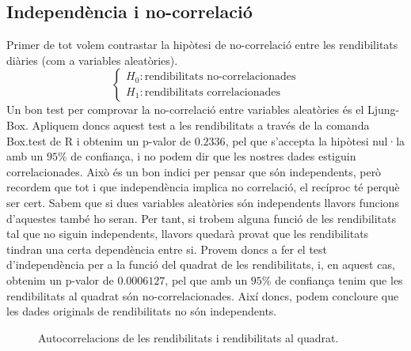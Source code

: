 \documentclass{article}
\numberwithin{table}{section}
\numberwithin{figure}{section}
\numberwithin{equation}{section}
\begin{document}
\subsection{Independència i no-correlació}%
Primer de tot volem contrastar la hipòtesi de no-correlació entre les rendibilitats diàries (com a variables aleatòries).
\begin{equation}
  \begin{cases}
    H_0: \text{rendibilitats no-correlacionades}\\
    H_1: \text{rendibilitats correlacionades}
  \end{cases}
\end{equation}
Un bon test per comprovar la no-correlació entre variables aleatòries és el Ljung-Box. Apliquem doncs aquest test a les rendibilitats a través de la comanda Box.test de R i obtenim un p-valor de $0.2336$, pel que s'accepta la hipòtesi nul·la amb un $95\%$ de confiança, i no podem dir que les nostres dades estiguin correlacionades. Això és un bon indici per pensar que són independents, però recordem que tot i que independència implica no correlació, el recíproc té perquè ser cert. Sabem que si dues variables aleatòries són independents llavors funcions d’aquestes també ho seran. Per tant, si trobem alguna funció de les rendibilitats tal que no siguin independents, llavors quedarà provat que les rendibilitats tindran una certa dependència entre si.  Provem doncs a fer el test d’independència per a la funció del quadrat de les rendibilitats, i, en aquest cas, obtenim un p-valor de $0.0006127$, pel que amb un $95\%$ de confiança tenim que les rendibilitats al quadrat són no-correlacionades. Així doncs, podem concloure que les dades originals de rendibilitats no són independents. 
\begin{figure}[H]
  \caption{Autocorrelacions de les rendibilitats i rendibilitats al quadrat.}
\end{figure}
\end{document}
